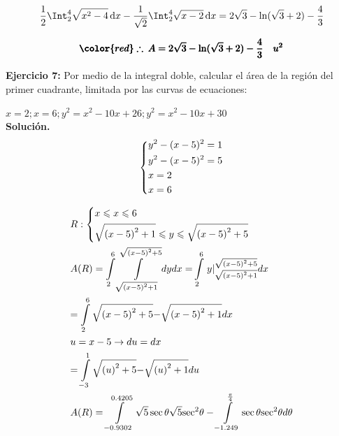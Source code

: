 \documentclass[12pt]{article}
\begin{document}
\begin{align}
	\frac{1}{2} \Int_2^4 \sqrt{x^2-4}\, \mathrm{d}x - \frac{1}{\sqrt{2}} \Int_2^4 \sqrt{x-2}\, \mathrm{d}x = 2\sqrt{3} - \ln(\sqrt{3}+2) - \frac{4}{3}
\end{align}

\begin{align*}
	 \pmb{\color{red} \therefore\: A = 2\sqrt{3} - \ln(\sqrt{3}+2) - \frac{4}{3}\quad u^2}
\end{align*}


\noindent \textbf{Ejercicio 7:} Por medio de la integral doble, calcular el área de la región del primer cuadrante, limitada por las curvas de ecuaciones:\par
$x=2;x=6;{{y}^{2}}={{x}^{2}}-10x+26;{{y}^{2}}={{x}^{2}}-10x+30$\\
\vspace{5mm}
\textbf{Solución.}
\vspace{5mm}
\[\left\{ \begin{gathered}
  {y^2} - {(x - 5)^2} = 1 \hfill \\
  {y^2} - {(x - 5)^2} = 5 \hfill \\
  x = 2 \hfill \\
  x = 6 \hfill \\ 
\end{gathered}  \right.\]

\[\begin{gathered}
  R:\left\{ \begin{gathered}
  x \leqslant x \leqslant 6 \hfill \\
  \sqrt {{{(x - 5)}^2} + 1}  \leqslant y \leqslant \sqrt {{{(x - 5)}^2} + 5}  \hfill \\ 
\end{gathered}  \right. \hfill \\
  A(R) = \int\limits_2^6 {\int\limits_{\sqrt {{{(x - 5)}^2} + 1} }^{\sqrt {{{(x - 5)}^2} + 5} } {dydx = } } \int\limits_2^6 {\left. y \right|_{\sqrt {{{(x - 5)}^2} + 1} }^{\sqrt {{{(x - 5)}^2} + 5} }} dx \hfill \\
   = \int\limits_2^6 {\sqrt {{{(x - 5)}^2} + 5}  - } \sqrt {{{(x - 5)}^2} + 1} dx \hfill \\
  u = x - 5 \to du = dx \hfill \\
   = \int\limits_{ - 3}^1 {\sqrt {{{(u)}^2} + 5}  - } \sqrt {{{(u)}^2} + 1} du \hfill \\
  A(R) = \int\limits_{ - 0.9302}^{0.4205} {\sqrt 5 \sec \theta \sqrt 5 {{\sec }^2}\theta  - \int\limits_{ - 1.249}^{\frac{\pi }{4}} {\sec \theta {{\sec }^2}\theta d\theta } }  \hfill \\ 
\end{gathered} \]
\end{document}
